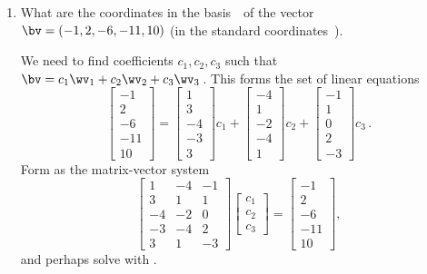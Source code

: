 \begin{example}
\begin{enumerate}
\item What are the coordinates in the basis~\cW\ of the vector \(\bv=(-1,2,-6,-11,10)\) (in the standard coordinates~\cE).
\begin{solution} 
We need to find coefficients \(c_1,c_2,c_3\) such that \(\bv=c_1\wv_1+c_2\wv_2+c_3\wv_3\)\,.
This forms the set of linear equations
\begin{equation*}
\begin{bmatrix}-1\\2\\-6\\-11\\10 \end{bmatrix}
=\begin{bmatrix} 1\\3\\-4\\-3\\3 \end{bmatrix}c_1
+\begin{bmatrix} -4\\1\\-2\\-4\\1 \end{bmatrix}c_2
+\begin{bmatrix} -1\\1\\0\\2\\-3 \end{bmatrix}c_3\,.
\end{equation*}
Form as the matrix-vector system
\begin{equation*}
\begin{bmatrix}1&-4&-1
\\ 3&1&1
\\-4&-2&0
\\-3&-4&2
\\ 3&1&-3\end{bmatrix}
\begin{bmatrix} c_1\\c_2\\c_3 \end{bmatrix}
=\begin{bmatrix}-1\\2\\-6\\-11\\10 \end{bmatrix},
\end{equation*}
and perhaps solve with \script.

\end{solution}
\end{enumerate}
\end{example}
